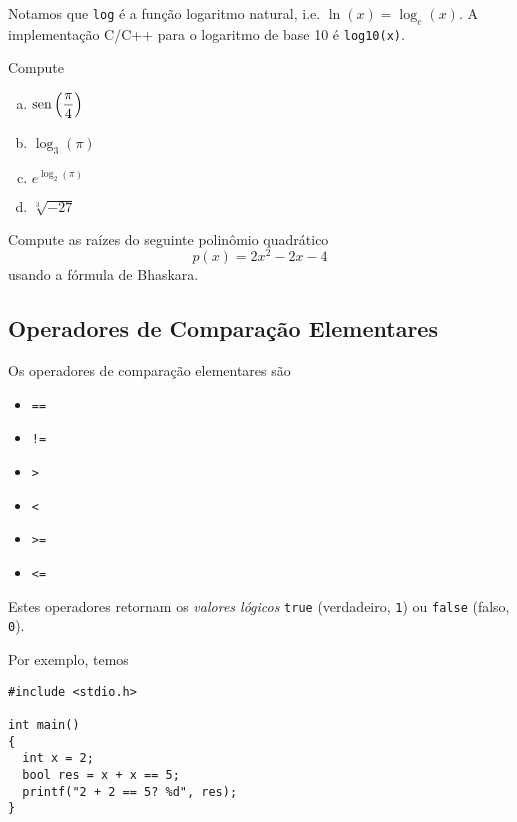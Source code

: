 \documentclass[12pt]{article}
\begin{document}
\begin{obs}
  Notamos que \lstinline+log+ é a função logaritmo natural, i.e. $\ln(x) = \log_e(x)$. A implementação C/C++ para o logaritmo de base 10 é \lstinline!log10(x)!.
\end{obs}

\begin{exr}
  Compute
  \begin{enumerate}[a)]
  \item $\displaystyle \operatorname{sen}\left(\frac{\pi}{4}\right)$
  \item $\displaystyle \log_3(\pi)$
  \item $\displaystyle e^{\log_2(\pi)}$
  \item $\displaystyle \sqrt[3]{-27}$
  \end{enumerate}
\end{exr}

\begin{exr}\label{exr:bhaskara}
  Compute as raízes do seguinte polinômio quadrático
  \begin{equation}
    p(x) = 2x^2 - 2x - 4
  \end{equation}
  usando a fórmula de Bhaskara{\bhaskara}.
\end{exr}

\subsection{Operadores de Comparação Elementares}

Os operadores de comparação elementares são
\begin{itemize}
\item[] {\lstinline+==+} 
\item[] {\lstinline+!=+} 
\item[] {\lstinline+>+} 
\item[] {\lstinline+<+} 
\item[] {\lstinline+>=+} 
\item[] {\lstinline+<=+} 
\end{itemize}
Estes operadores retornam os \emph{valores lógicos} \lstinline!true! (verdadeiro, \lstinline!1!) ou \lstinline!false! (falso, \lstinline!0!).

Por exemplo, temos
\begin{lstlisting}[caption=opComp.cc]
#include <stdio.h>

int main()
{
  int x = 2;
  bool res = x + x == 5;
  printf("2 + 2 == 5? %d", res);
}
\end{lstlisting}
\end{document}
